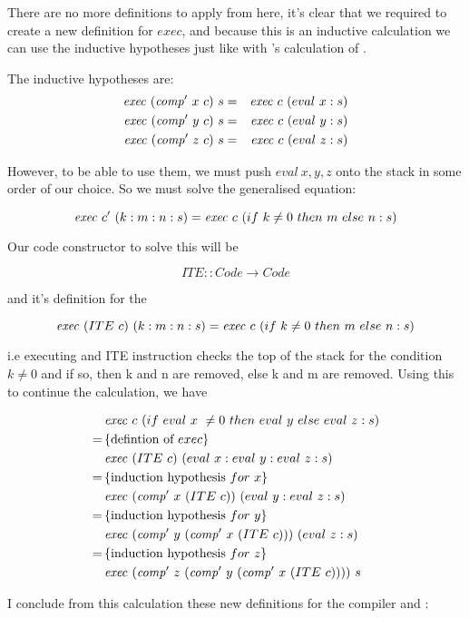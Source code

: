 \documentclass {article}
\begin{document}
There are no more definitions to apply from here,
it's clear that we required to
create a new definition for $exec$,
and because this is an inductive calculation
we can use the inductive hypotheses
just like with \BH's calculation of \add.

The inductive hypotheses are:
\begin{eqnarray*}
	\mathit{exec\ } (\mathit{comp'\ }  x\ c)\ s &=& \mathit{exec\ } c\ (eval\ x:s) \\
	\mathit{exec\ } (\mathit{comp'\ }  y\ c)\ s &=& \mathit{exec\ } c\ (eval\ y:s) \\
	\mathit{exec\ } (\mathit{comp'\ }  z\ c)\ s &=& \mathit{exec\ } c\ (eval\ z:s)
\end{eqnarray*}

However, to be able to use them,
we must push $eval\ x,y,z$ onto the stack
in some order of our choice.
So we must solve the generalised equation:

	\[ \mathit{exec\ } c'\ (k:m:n:s) 
		= \mathit{exec\ } c\ (if\ k \not= 0\ then\ m\ else\ n:s)\]

Our code constructor to solve this will be

	\[ ITE :: Code \rightarrow Code \]

and it's definition for the \vm

	\[ \mathit{exec\ } (ITE\ c)\ (k:m:n:s) 
		= \mathit{exec\ } c\ (if\ k \not= 0\ then\ m\ else\ n:s) \]

i.e executing and ITE instruction
checks the top of the stack for the condition $k \not= 0$
and if so, then k and n are removed,
else k and m are removed.
Using this to continue the calculation, we have

\begin{align*}
	&\mathit{exec\ } c\ (if\ eval\ x\ \not= 0\ then\ eval\ y\ else\ eval\ z :s) \\
	=\, & \{\mbox{defintion of}\ exec\} \\
	&\mathit{exec\ } (ITE\ c)\ (eval\ x:eval\ y:eval\ z:s) \\
	=\, & \{\mbox{induction hypothesis}\ for\ x\} \\
	&\mathit{exec\ } (\mathit{comp'\ }  x\ (ITE\ c))\ (eval\ y:eval\ z:s) \\
	=\, & \{\mbox{induction hypothesis}\ for\ y\} \\
	&\mathit{exec\ } (\mathit{comp'\ }  y\ (\mathit{comp'\ }  x\ (ITE\ c)))\ (eval\ z:s) \\
	=\, & \{\mbox{induction hypothesis}\ for\ z\} \\
	&\mathit{exec\ } (\mathit{comp'\ }  z\ (\mathit{comp'\ }  y\ (\mathit{comp'\ }  x\ (ITE\ c))))\ s
\end{align*}

I conclude from this calculation these new definitions
for the compiler and \vm: 
\end{document}

